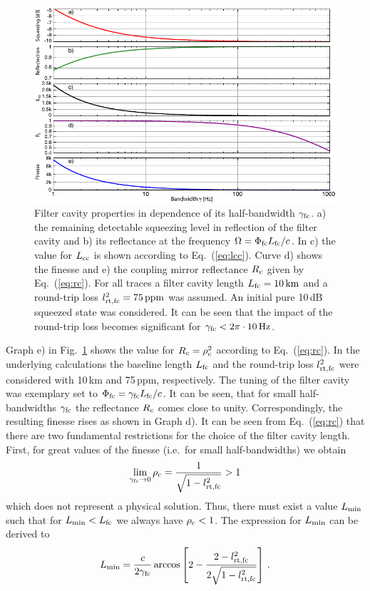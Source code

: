 \begin{figure}
\centering
\includegraphics[scale = 1.2]{./Sec_Optics/FCsgammaAI75ppm.pdf}
\caption{Filter cavity properties in dependence of its half-bandwidth $\gamma_{\rm fc}$.  a) the remaining detectable squeezing level in reflection of the filter cavity and b) its reflectance at the frequency $\Omega =  \Phi_{\rm fc}L_{\rm fc}/c$. In c) the value for $L_{\rm cc}$ is shown according to Eq.~(\ref{eq:lcc}).  Curve d) shows the finesse and e) the coupling mirror reflectance $R_{\rm c}$ given by Eq.~(\ref{eq:rc}). For all traces a filter cavity length $L_{\rm fc}=10\,{\rm km}$ and a round-trip loss $l_{\rm rt,fc}^2=75\,{\rm ppm}$ was assumed. An initial pure 10\,dB squeezed state was considered. It can be seen that the impact of the round-trip loss becomes significant for $\gamma_{\rm fc}<2\pi\cdot10\,{\rm Hz}$.} \label{fig:gamma}
\end{figure}

Graph e) in Fig.~\ref{fig:gamma} shows the value for $R_{\rm
c}=\rho_{\rm c}^2$ according to Eq.~(\ref{eq:rc}). In the
underlying calculations the baseline length $L_{\rm fc}$ and the
round-trip loss $l_{\rm rt,fc}^2$ were considered with 10\,km and
75\,ppm, respectively.  The tuning of the filter cavity was
exemplary set to $\Phi_{\rm fc}=\gamma_{\rm fc}L_{\rm fc}/c$. It
can be seen, that for small half-bandwidths $\gamma_{\rm fc}$ the
reflectance  $R_{\rm c}$ comes close to unity.  Correspondingly,
the resulting finesse rises as shown in Graph d). It can be seen
from Eq.~(\ref{eq:rc}) that there are two fundamental restrictions
for the choice of the filter cavity length. First, for great
values of the finesse (i.e.\ for small half-bandwidths) we obtain
\begin{equation}
\lim_{\gamma_{\rm fc} \to 0} \rho_{\rm c} = \frac{1}{\sqrt{1-l_{\rm rt,fc}^2}}> 1
\end{equation}
which does not represent a physical solution. Thus, there must
exist a value $L_{\rm min}$ such that for $L_{\rm min} < L_{\rm
fc}$ we always have $\rho_{\rm c}<1$. The expression for $L_{\rm
min}$ can be derived to
\begin{equation}
L_{\rm{min}} =
\frac{c}{2\gamma_{\rm{fc}}}\arccos\left[2-\frac{2-l_{\rm{rt,fc}}^2}{2\sqrt{1-l_{\rm{rt,fc}}^2}}\right]\,.
\end{equation}

